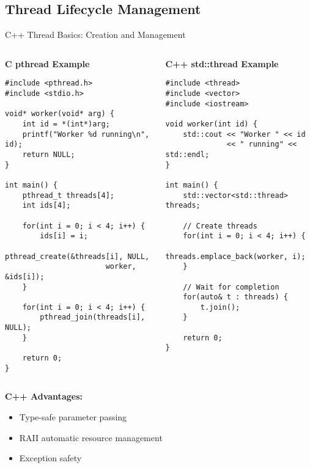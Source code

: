 \subsection{Thread Lifecycle Management}
\begin{frame}[fragile]{ C++ Thread Basics: Creation and Management}
	\begin{columns}
		\begin{column}{0.5\textwidth}
			\textbf{C pthread Example}
			\begin{verbatim}
#include <pthread.h>
#include <stdio.h>

void* worker(void* arg) {
    int id = *(int*)arg;
    printf("Worker %d running\n", id);
    return NULL;
}

int main() {
    pthread_t threads[4];
    int ids[4];

    for(int i = 0; i < 4; i++) {
        ids[i] = i;
        pthread_create(&threads[i], NULL,
                       worker, &ids[i]);
    }

    for(int i = 0; i < 4; i++) {
        pthread_join(threads[i], NULL);
    }

    return 0;
}
			\end{verbatim}
		\end{column}
		\begin{column}{0.5\textwidth}
			\textbf{C++ std::thread Example}
			\begin{verbatim}
#include <thread>
#include <vector>
#include <iostream>

void worker(int id) {
    std::cout << "Worker " << id
              << " running" << std::endl;
}

int main() {
    std::vector<std::thread> threads;

    // Create threads
    for(int i = 0; i < 4; i++) {
        threads.emplace_back(worker, i);
    }

    // Wait for completion
    for(auto& t : threads) {
        t.join();
    }

    return 0;
}
			\end{verbatim}
		\end{column}
	\end{columns}

	\vspace{0.5em}
	\textbf{C++ Advantages:}
	\begin{itemize}
		\item Type-safe parameter passing
		\item RAII automatic resource management
		\item Exception safety
	\end{itemize}
\end{frame}


